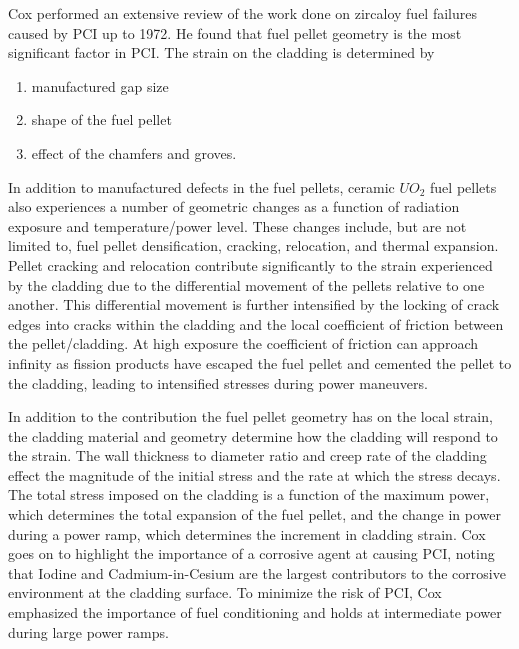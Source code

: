\documentclass[edeposit,fullpage,11pt]{uiucthesis2009}
\begin{document}
Cox \cite{cox_pellet-clad_1990} performed an extensive review of the work done on zircaloy fuel failures caused by \gls{PCI} up to 1972.
He found that fuel pellet geometry is the most significant factor in \gls{PCI}.
The strain on the cladding is determined by
\begin{enumerate}
\item manufactured gap size
\item shape of the fuel pellet
\item effect of the chamfers and groves.
\end{enumerate} 
In addition to manufactured defects in the fuel pellets, ceramic $UO_2$ fuel pellets also experiences a number of geometric changes as a function of radiation exposure and temperature/power level.
These changes include, but are not limited to, fuel pellet  densification, cracking, relocation, and thermal expansion. 
Pellet cracking and relocation contribute significantly to the strain experienced by the cladding due to the differential movement of the pellets relative to one another.
This differential movement is further intensified  by the locking of crack edges into cracks within the cladding and the local coefficient of friction between the pellet/cladding.
At high exposure the coefficient of friction can approach infinity as fission products have escaped the fuel pellet and cemented the pellet to the cladding, leading to intensified stresses during power maneuvers. 

In addition to the contribution the fuel pellet geometry has on the local strain, the cladding material and geometry determine how the cladding will respond to the strain.
The wall thickness to diameter ratio and creep rate of the cladding effect the magnitude of the initial stress and the rate at which the stress decays.
The total stress imposed on the cladding is a function of the maximum power, which determines the total expansion of the fuel pellet, and the change in power during a power ramp, which determines the increment in cladding strain.
Cox goes on to highlight the importance of a corrosive agent at causing \gls{PCI}, noting that Iodine and Cadmium-in-Cesium are the largest contributors to the corrosive environment at the cladding surface.
To minimize the risk of \gls{PCI}, Cox emphasized the importance of fuel conditioning and holds at intermediate power during large power ramps.
\end{document}
